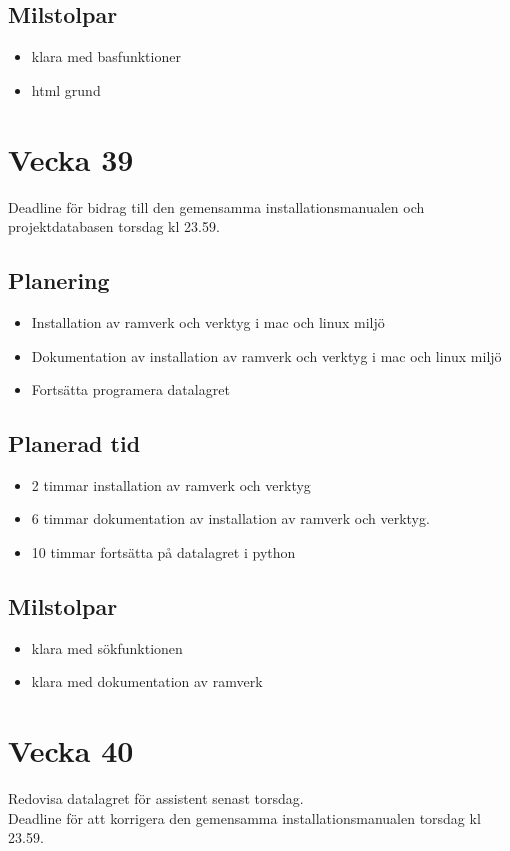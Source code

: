 \documentclass{TDP003mall}
\begin{document}
\subsection{Milstolpar}
\begin{itemize}
\item klara med basfunktioner
\item html grund
\end{itemize}

\section{Vecka 39}
Deadline för bidrag till den gemensamma installationsmanualen och projektdatabasen torsdag kl 23.59.\\

\subsection{Planering}
\begin{itemize}
\item Installation av ramverk och verktyg i mac och linux miljö
\item Dokumentation av installation av ramverk och verktyg i mac och linux miljö
\item Fortsätta programera datalagret
\end{itemize}

\subsection{Planerad tid}
\begin{itemize}
\item 2 timmar installation av ramverk och verktyg
\item 6 timmar dokumentation av installation av ramverk och verktyg.
\item 10 timmar fortsätta på datalagret i python   
\end{itemize}

\subsection{Milstolpar}
\begin{itemize}
\item klara med sökfunktionen
\item klara med dokumentation av ramverk
\end{itemize}

\section{Vecka 40}
Redovisa datalagret för assistent senast torsdag.\\
Deadline för att korrigera den gemensamma installationsmanualen torsdag kl 23.59.\\
\end{document}

